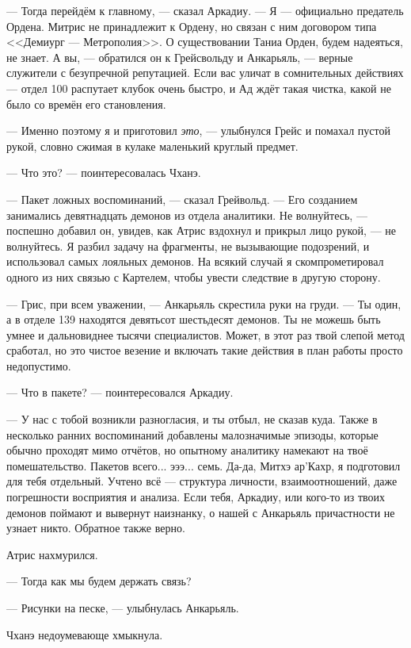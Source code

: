 --- Тогда перейдём к главному, --- сказал Аркадиу.
--- Я --- официально предатель Ордена.
Митрис не принадлежит к Ордену, но связан с ним договором типа <<Демиург --- Метрополия>>.
О существовании Таниа Орден, будем надеяться, не знает.
А вы, --- обратился он к Грейсвольду и Анкарьяль, --- верные служители с безупречной репутацией.
Если вас уличат в сомнительных действиях --- отдел 100 распутает клубок очень быстро, и Ад ждёт такая чистка, какой не было со времён его становления.

--- Именно поэтому я и приготовил \emph{это}, --- улыбнулся Грейс и помахал пустой рукой, словно сжимая в кулаке маленький круглый предмет.

--- Что это? --- поинтересовалась Чханэ.

--- Пакет ложных воспоминаний, --- сказал Грейвольд.
--- Его созданием занимались девятнадцать демонов из отдела аналитики.
Не волнуйтесь, --- поспешно добавил он, увидев, как Атрис вздохнул и прикрыл лицо рукой, --- не волнуйтесь.
Я разбил задачу на фрагменты, не вызывающие подозрений, и использовал самых лояльных демонов.
На всякий случай я скомпрометировал одного из них связью с Картелем, чтобы увести следствие в другую сторону.

--- Грис, при всем уважении, --- Анкарьяль скрестила руки на груди.
--- Ты один, а в отделе 139 находятся девятьсот шестьдесят демонов.
Ты не можешь быть умнее и дальновиднее тысячи специалистов.
Может, в этот раз твой слепой метод сработал, но это чистое везение и включать такие действия в план работы просто недопустимо.

--- Что в пакете? --- поинтересовался Аркадиу.

--- У нас с тобой возникли разногласия, и ты отбыл, не сказав куда.
Также в несколько ранних воспоминаний добавлены малозначимые эпизоды, которые обычно проходят мимо отчётов, но опытному аналитику намекают на твоё помешательство.
Пакетов всего... эээ... семь.
Да-да, Митхэ ар’Кахр, я подготовил для тебя отдельный.
Учтено всё --- структура личности, взаимоотношений, даже погрешности восприятия и анализа.
Если тебя, Аркадиу, или кого-то из твоих демонов поймают и вывернут наизнанку, о нашей с Анкарьяль причастности не узнает никто.
Обратное также верно.

Атрис нахмурился.

--- Тогда как мы будем держать связь?

--- Рисунки на песке, --- улыбнулась Анкарьяль.

Чханэ недоумевающе хмыкнула.

